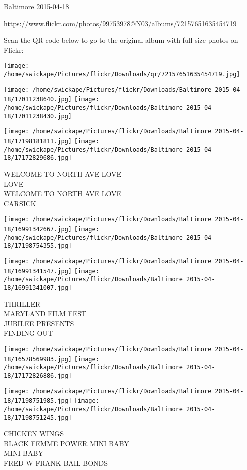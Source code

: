 \documentclass[10pt,letterpaper]{article}
\begin{document}
Baltimore 2015-04-18

https://www.flickr.com/photos/99753978@N03/albums/72157651635454719

Scan the QR code below to go to the original album with full-size photos on Flickr:

\texttt{[image: /home/swickape/Pictures/flickr/Downloads/qr/72157651635454719.jpg]}
\pagebreak

\texttt{[image: /home/swickape/Pictures/flickr/Downloads/Baltimore 2015-04-18/17011238640.jpg]}
\texttt{[image: /home/swickape/Pictures/flickr/Downloads/Baltimore 2015-04-18/17011238430.jpg]}

\texttt{[image: /home/swickape/Pictures/flickr/Downloads/Baltimore 2015-04-18/17198181811.jpg]}
\texttt{[image: /home/swickape/Pictures/flickr/Downloads/Baltimore 2015-04-18/17172829686.jpg]}

WELCOME TO NORTH AVE LOVE\\
LOVE\\
WELCOME TO NORTH AVE LOVE\\
CARSICK\\
\pagebreak

\texttt{[image: /home/swickape/Pictures/flickr/Downloads/Baltimore 2015-04-18/16991342667.jpg]}
\texttt{[image: /home/swickape/Pictures/flickr/Downloads/Baltimore 2015-04-18/17198754355.jpg]}

\texttt{[image: /home/swickape/Pictures/flickr/Downloads/Baltimore 2015-04-18/16991341547.jpg]}
\texttt{[image: /home/swickape/Pictures/flickr/Downloads/Baltimore 2015-04-18/16991341007.jpg]}

THRILLER\\
MARYLAND FILM FEST\\
JUBILEE PRESENTS\\
FINDING OUT\\
\pagebreak

\texttt{[image: /home/swickape/Pictures/flickr/Downloads/Baltimore 2015-04-18/16578569983.jpg]}
\texttt{[image: /home/swickape/Pictures/flickr/Downloads/Baltimore 2015-04-18/17172826886.jpg]}

\texttt{[image: /home/swickape/Pictures/flickr/Downloads/Baltimore 2015-04-18/17198751985.jpg]}
\texttt{[image: /home/swickape/Pictures/flickr/Downloads/Baltimore 2015-04-18/17198751245.jpg]}

CHICKEN WINGS\\
BLACK FEMME POWER MINI BABY\\
MINI BABY\\
FRED W FRANK BAIL BONDS\\
\pagebreak
\end{document}
